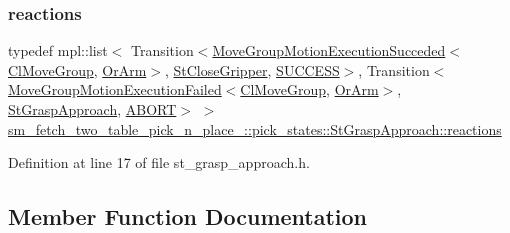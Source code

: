 \subsubsection{\texorpdfstring{reactions}{reactions}}
{\footnotesize\ttfamily typedef mpl\+::list$<$ Transition$<$\hyperlink{structcl__move__group__interface_1_1MoveGroupMotionExecutionSucceded}{Move\+Group\+Motion\+Execution\+Succeded}$<$\hyperlink{classcl__move__group__interface_1_1ClMoveGroup}{Cl\+Move\+Group}, \hyperlink{classsm__fetch__two__table__pick__n__place__1_1_1OrArm}{Or\+Arm}$>$, \hyperlink{structsm__fetch__two__table__pick__n__place__1_1_1pick__states_1_1StCloseGripper}{St\+Close\+Gripper}, \hyperlink{classSUCCESS}{S\+U\+C\+C\+E\+SS}$>$, Transition$<$\hyperlink{structcl__move__group__interface_1_1MoveGroupMotionExecutionFailed}{Move\+Group\+Motion\+Execution\+Failed}$<$\hyperlink{classcl__move__group__interface_1_1ClMoveGroup}{Cl\+Move\+Group}, \hyperlink{classsm__fetch__two__table__pick__n__place__1_1_1OrArm}{Or\+Arm}$>$, \hyperlink{structsm__fetch__two__table__pick__n__place__1_1_1pick__states_1_1StGraspApproach}{St\+Grasp\+Approach}, \hyperlink{classABORT}{A\+B\+O\+RT}$>$ $>$ \hyperlink{structsm__fetch__two__table__pick__n__place__1_1_1pick__states_1_1StGraspApproach_a1ad3c3b9bf4375e58d4431b999b8390f}{sm\+\_\+fetch\+\_\+two\+\_\+table\+\_\+pick\+\_\+n\+\_\+place\+\_\+::pick\+\_\+states\+::\+St\+Grasp\+Approach\+::reactions}}



Definition at line 17 of file st\+\_\+grasp\+\_\+approach.\+h.



\subsection{Member Function Documentation}
\mbox{\label{structsm__fetch__two__table__pick__n__place__1_1_1pick__states_1_1StGraspApproach_aa727e70306515944e1bd2e23ff89e44e}} 
